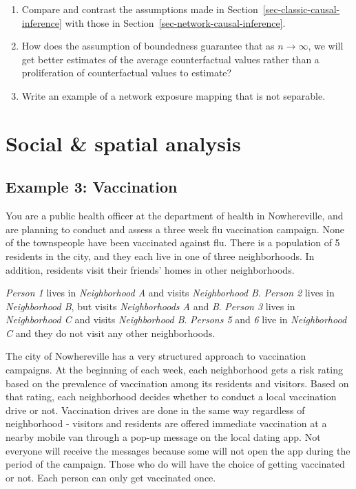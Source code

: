 \documentclass[
  letterpaper,
  DIV=11,
  numbers=noendperiod,
  oneside]{scrreprt}
\begin{document}
\begin{enumerate}
\def\labelenumi{\arabic{enumi}.}
\item
  Compare and contrast the assumptions made in
  Section~\ref{sec-classic-causal-inference} with those in
  Section~\ref{sec-network-causal-inference}.
\item
  How does the assumption of boundedness guarantee that as
  \(n \rightarrow \infty\), we will get better estimates of the average
  counterfactual values rather than a proliferation of counterfactual
  values to estimate?
\item
  Write an example of a network exposure mapping that is not separable.
\end{enumerate}

\hypertarget{sec-ssnac}{%
\section{Social \& spatial analysis}\label{sec-ssnac}}

\hypertarget{example-3-vaccination}{%
\subsection*{Example 3: Vaccination}\label{example-3-vaccination}}

You are a public health officer at the department of health in
Nowhereville, and are planning to conduct and assess a three week flu
vaccination campaign. None of the townspeople have been vaccinated
against flu. There is a population of 5 residents in the city, and they
each live in one of three neighborhoods. In addition, residents visit
their friends' homes in other neighborhoods.

\emph{Person 1} lives in \emph{Neighborhood A} and visits
\emph{Neighborhood B}. \emph{Person 2} lives in \emph{Neighborhood B},
but visits \emph{Neighborhoods A} and \emph{B}. \emph{Person 3} lives in
\emph{Neighborhood C} and visits \emph{Neighborhood B}. \emph{Persons 5}
and \emph{6} live in \emph{Neighborhood C} and they do not visit any
other neighborhoods.

The city of Nowhereville has a very structured approach to vaccination
campaigns. At the beginning of each week, each neighborhood gets a risk
rating based on the prevalence of vaccination among its residents and
visitors. Based on that rating, each neighborhood decides whether to
conduct a local vaccination drive or not. Vaccination drives are done in
the same way regardless of neighborhood - visitors and residents are
offered immediate vaccination at a nearby mobile van through a pop-up
message on the local dating app. Not everyone will receive the messages
because some will not open the app during the period of the campaign.
Those who do will have the choice of getting vaccinated or not. Each
person can only get vaccinated once.
\end{document}
